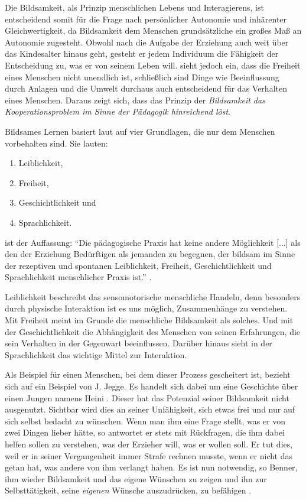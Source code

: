 Die Bildsamkeit, als Prinzip menschlichen Lebens und Interagierens, ist entscheidend somit für die Frage nach persönlicher Autonomie und inhärenter Gleichwertigkeit, da Bildsamkeit dem Menschen grundsätzliche ein großes Maß an Autonomie zugesteht.
Obwohl nach \citeauthor{benner-2012} die Aufgabe der Erziehung auch weit über das Kindesalter hinaus geht, gesteht er jedem Individuum die Fähigkeit der Entscheidung zu, was er von seinem Leben will.
\citeauthor{benner-2012} sieht jedoch ein, dass die Freiheit eines Menschen nicht unendlich ist, schließlich sind Dinge wie Beeinflussung durch Anlagen und die Umwelt durchaus auch entscheidend für das Verhalten eines Menschen.
Daraus zeigt sich, dass das Prinzip der \emph{Bildsamkeit das Kooperationsproblem im Sinne der Pädagogik hinreichend löst}.

Bildsames Lernen basiert laut \citeauthor{benner-2012} auf vier Grundlagen, die nur dem Menschen vorbehalten sind.
Sie lauten:
\begin{enumerate}
	\item Leiblichkeit,
	\item Freiheit,
	\item Geschichtlichkeit und
	\item Sprachlichkeit.
\end{enumerate}

\citeauthor{benner-2012} ist der Auffassung:
``Die pädagogische Praxis hat keine andere Möglichkeit [...] als den der Erziehung Bedürftigen als jemanden zu begegnen, der bildsam im Sinne der rezeptiven und spontanen Leiblichkeit, Freiheit, Geschichtlichkeit und Sprachlichkeit menschlicher Praxis ist.'' \parencite[vgl.][76]{benner-2012}.

Leiblichkeit beschreibt das sensomotorische menschliche Handeln, denn besonders durch physische Interaktion ist es uns möglich, Zusammenhänge zu verstehen.
Mit Freiheit meint \citeauthor{benner-2012} im Grunde die menschliche Bildsamkeit als solches.
Und mit der Geschichtlichkeit die Abhängigkeit des Menschen von seinen Erfahrungen, die sein Verhalten in der Gegenwart beeinflussen.
Darüber hinaus sieht \citeauthor{benner-2012} in der Sprachlichkeit das wichtige Mittel zur Interaktion.

Als Beispiel für einen Menschen, bei dem dieser Prozess gescheitert ist, bezieht sich \citeauthor{benner-2012} auf ein Beispiel von J. Jegge.
Es handelt sich dabei um eine Geschichte über einen Jungen namens Heini \parencite[vgl.][74]{benner-2012}.
Dieser hat das Potenzial seiner Bildsamkeit nicht ausgenutzt.
Sichtbar wird dies an seiner Unfähigkeit, sich etwas frei und nur auf sich selbst bedacht zu wünschen.
Wenn man ihm eine Frage stellt, was er von zwei Dingen lieber hätte, so antwortet er stets mit Rückfragen, die ihm dabei helfen sollen zu verstehen, was der Erzieher will, was er wollen soll.
Er tut dies, weil er in seiner Vergangenheit immer Strafe rechnen musste, wenn er nicht das getan hat, was andere von ihm verlangt haben.
Es ist nun notwendig, so Benner, ihm wieder Bildsamkeit und das eigene Wünschen zu zeigen und ihn zur Selbsttätigkeit, seine \emph{eigenen} Wünsche auszudrücken, zu befähigen \parencite[vgl.][20]{benner-2012}.

